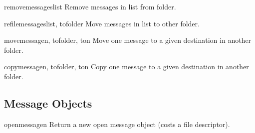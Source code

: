 \begin{methoddesc}[Folder]{removemessages}{list}
Remove messages in list from folder.
\end{methoddesc}

\begin{methoddesc}[Folder]{refilemessages}{list, tofolder}
Move messages in list to other folder.
\end{methoddesc}

\begin{methoddesc}[Folder]{movemessage}{n, tofolder, ton}
Move one message to a given destination in another folder.
\end{methoddesc}

\begin{methoddesc}[Folder]{copymessage}{n, tofolder, ton}
Copy one message to a given destination in another folder.
\end{methoddesc}


\subsection{Message Objects \label{mh-message-objects}}

\begin{methoddesc}[Message]{openmessage}{n}
Return a new open message object (costs a file descriptor).
\end{methoddesc}
